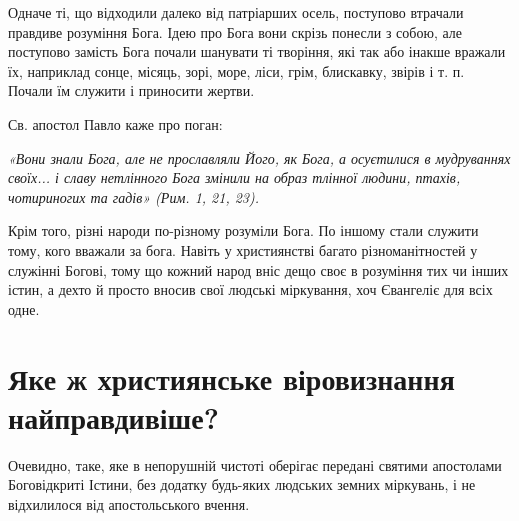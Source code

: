 \documentclass[main.tex]{subfiles}
\begin{document}
Одначе ті, що відходили далеко від патріарших осель, поступово втрачали правдиве розуміння Бога. Ідею про Бога вони скрізь понесли з собою, але поступово замість Бога почали шанувати ті творіння, які так або інакше вражали їх, наприклад сонце, місяць, зорі, море, ліси, грім, блискавку, звірів і т. п. Почали їм служити і приносити жертви.

Св. апостол Павло каже про поган:
\begin{FlushRight}
    \emph{«Вони знали Бога, але не прославляли Його, як Бога, а осуєтилися в мудруваннях своїх... і славу нетлінного Бога змінили на образ тлінної людини, птахів, чотириногих та гадів» (Рим. 1, 21, 23).}
\end{FlushRight}

Крім того, різні народи по-різному розуміли Бога. По іншому стали служити тому, кого вважали за бога. Навіть у християнстві багато різноманітностей у служінні Богові, тому що кожний народ вніс дещо своє в розуміння тих чи інших істин, а дехто й просто вносив свої людські міркування, хоч Євангеліє для всіх одне.

\section{Яке ж християнське віровизнання найправдивіше?}

Очевидно, таке, яке в непорушній чистоті оберігає передані святими апостолами Боговідкриті Істини, без додатку будь-яких людських земних міркувань, і не відхилилося від апостольського вчення.
\end{document}
